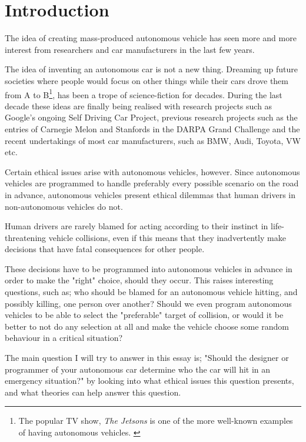 \chapter{Introduction}

\newpar The idea of creating mass-produced autonomous vehicle has seen more and more interest from researchers and car manufacturers in the last few years.

The idea of inventing an autonomous car is not a new thing. Dreaming up future societies where people would focus on other things while their cars drove them from A to B\footnote{The popular TV show, \textit{The Jetsons} is one of the more well-known examples of having autonomous vehicles. \cite{wiki:jetsons}}, has been a trope of science-fiction for decades. During the last decade these ideas are finally being realised with research projects such as Google's ongoing Self Driving Car Project, previous research projects such as the entries of Carnegie Melon and Stanfords in the DARPA Grand Challenge \cite{wiki:darpachallenge} and the recent undertakings of most car manufacturers, such as BMW, Audi, Toyota, VW etc. \cite{forbes:timeline}

\newpar Certain ethical issues arise with autonomous vehicles, however. Since autonomous vehicles are programmed to handle preferably every possible scenario on the road in advance, autonomous vehicles present ethical dilemmas that human drivers in non-autonomous vehicles do not. 

\begin{quote}
\end{quote}

\newpar Human drivers are rarely blamed for acting according to their instinct in life-threatening vehicle collisions, even if this means that they inadvertently make decisions that have fatal consequences for other people. 

These decisions have to be programmed into autonomous vehicles in advance in order to make the "right" choice, should they occur. 
This raises interesting questions, such as; who should be blamed for an autonomous vehicle hitting, and possibly killing, one person over another? Should we even program autonomous vehicles to be able to select the "preferable" target of collision, or would it be better to not do any selection at all and make the vehicle choose some random behaviour in a critical situation?

The main question I will try to answer in this essay is; "Should the designer or programmer of your autonomous car determine who the car will hit in an emergency situation?" by looking into what ethical issues this question presents, and what theories can help answer this question.  